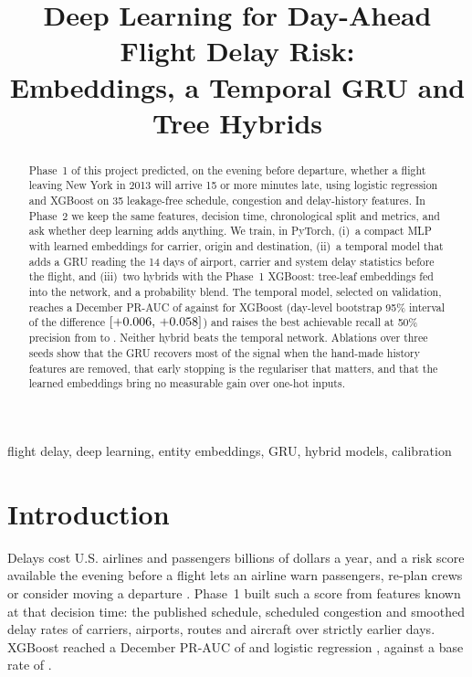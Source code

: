 \documentclass[conference]{IEEEtran}
\begin{document}
\title{Deep Learning for Day-Ahead Flight Delay Risk:\\Embeddings, a Temporal GRU and Tree Hybrids}

\author{
}

\maketitle

\begin{abstract}
Phase~1 of this project predicted, on the evening before departure, whether a flight
leaving New York in 2013 will arrive 15 or more minutes late, using logistic regression
and XGBoost on 35 leakage-free schedule, congestion and delay-history features. In
Phase~2 we keep the same features, decision time, chronological split and metrics, and
ask whether deep learning adds anything. We train, in PyTorch, (i)~a compact MLP with
learned embeddings for carrier, origin and destination, (ii)~a temporal model that adds
a GRU reading the 14 days of airport, carrier and system delay statistics before the
flight, and (iii)~two hybrids with the Phase~1 XGBoost: tree-leaf embeddings fed into
the network, and a probability blend. The temporal model, selected on validation,
reaches a December PR-AUC of \TemporalTestPR{} against \XgboostTestPR{} for XGBoost
(day-level bootstrap 95\% interval of the difference
$[+0.006,\,+0.058]$) and raises the best achievable recall at 50\%
precision from \XgboostRecallPfifty{} to \TemporalRecallPfifty. Neither hybrid beats
the temporal network. Ablations over three seeds show that the GRU recovers most of the
signal when the hand-made history features are removed, that early stopping is the
regulariser that matters, and that the learned embeddings bring no measurable gain over
one-hot inputs.
\end{abstract}

\begin{IEEEkeywords}
flight delay, deep learning, entity embeddings, GRU, hybrid models, calibration
\end{IEEEkeywords}

\section{Introduction}
Delays cost U.S. airlines and passengers billions of dollars a year, and a risk score
available the evening before a flight lets an airline warn passengers, re-plan crews or
consider moving a departure \cite{sternberg2017review}. Phase~1 built such a score from
features known at that decision time: the published schedule, scheduled congestion and
smoothed delay rates of carriers, airports, routes and aircraft over strictly earlier
days. XGBoost \cite{chen2016xgboost} reached a December PR-AUC of \XgboostTestPR{} and
logistic regression \LrTestPR, against a base rate of \PriorRateTestPR.
\end{document}
